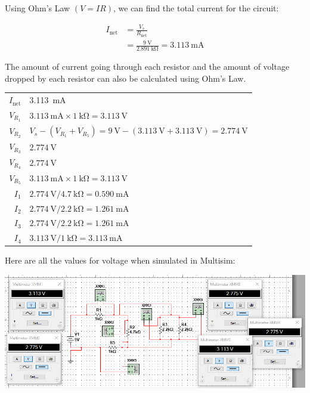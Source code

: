 \documentclass{article}
\begin{document}
Using Ohm's Law $(V=IR)$, we can find the total current
for the circuit:

\begin{align*}
    I_{\text{net}} &= \frac{V_s}{R_{\text{net}}}\\
    &= \frac{\SI{9}{\volt}}{\SI{2.891}{\kilo\ohm}} = \SI{3.113}{\milli\ampere}
\end{align*}

The amount of current going through each resistor and the
amount of voltage dropped by each resistor can also be
calculated using Ohm's Law.

\begin{center}
\begin{tabular}[c]{r|l}

    $I_{\text{net}}$ & \SI{3.113}{\milli\ampere} \\
    $V_{R_1}$ & $\SI{3.113}{\milli\ampere} \times \SI{1}{\kilo\ohm} = \SI{3.113}{\volt}$ \\
    $V_{R_2}$ & $V_s - (V_{R_1} + V_{R_5}) = \SI{9}{\volt} - (\SI{3.113}{\volt} + \SI{3.113}{\volt}) = \SI{2.774}{\volt}$ \\
    $V_{R_3}$ & $\SI{2.774}{\volt}$ \\
    $V_{R_4}$ & $\SI{2.774}{\volt}$ \\
    $V_{R_5}$ & $\SI{3.113}{\milli\ampere} \times \SI{1}{\kilo\ohm} = \SI{3.113}{\volt}$ \\
    $I_1$ & $\SI{2.774}{\volt} / \SI{4.7}{\kilo\ohm} = \SI{0.590}{\milli\ampere}$ \\
    $I_2$ & $\SI{2.774}{\volt} / \SI{2.2}{\kilo\ohm} = \SI{1.261}{\milli\ampere}$ \\
    $I_3$ & $\SI{2.774}{\volt} / \SI{2.2}{\kilo\ohm} = \SI{1.261}{\milli\ampere}$ \\
    $I_4$ & $\SI{3.113}{\volt} / \SI{1}{\kilo\ohm} = \SI{3.113}{\milli\ampere}$ \\

\end{tabular}
\end{center}

Here are all the values for voltage when simulated in Multisim:

\includegraphics[width=\textwidth]{Lab4Voltage.png}
\end{document}
